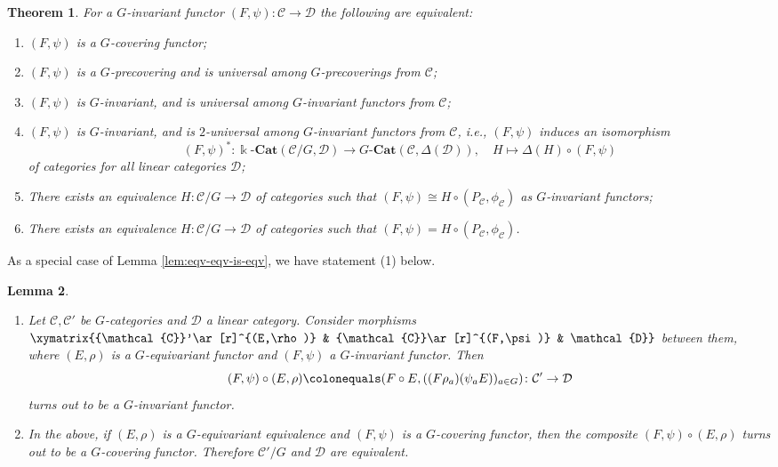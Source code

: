 \documentclass{surv-l}
\numberwithin{equation}{chapter}
\numberwithin{figure}{chapter}
\theoremstyle{plain}
\newtheorem{thm}{Theorem}[section]
\newtheorem{lem}[thm]{Lemma}
\theoremstyle{definition}
\theoremstyle{remark}
\newcommand{\kCat}{\Bbbk\text{-}\mathbf{Cat}}
\newcommand{\GCat}{G\text{-}\mathbf{Cat}}
\begin{document}
\begin{thm}\label{cov-characterization}
For a $G$-invariant functor $(F,\psi)\colon{\mathcal{C}}\to {\mathcal{D}}$
the following are equivalent:
\begin{enumerate}
\item $(F,\psi)$ is a $G$-covering functor;
\item $(F,\psi)$ is a $G$-precovering and is universal among
$G$-precoverings from ${\mathcal{C}}$;
\item $(F,\psi)$ is $G$-invariant, and is universal among
$G$-invariant functors from ${\mathcal{C}}$;
\item[(3$'$)] $(F,\psi)$ is $G$-invariant, and is $2$-universal among
$G$-invariant functors from ${\mathcal{C}}$, i.e.,
$(F,\psi)$ induces an isomorphism
\begin{equation*}
(F,\psi)^*\colon \kCat({\mathcal{C}}/G, {\mathcal{D}}) \to \GCat({\mathcal{C}}, \Delta({\mathcal{D}})),
\quad H \mapsto \Delta(H) \circ (F, \psi)
\end{equation*}
of categories for all linear categories ${\mathcal{D}}$;
\item  There exists an equivalence
$H\colon{\mathcal{C}}/G\to\mathcal{D}$ of categories such that
$(F,\psi)\cong H \circ (P_{\mathcal{C}},\phi_{\mathcal{C}})$ as $G$-invariant functors;

\item There exists an equivalence $H\colon{\mathcal{C}}/G\to\mathcal{D}$
of categories such that
$(F,\psi)=H\circ (P_{\mathcal{C}},\phi_{\mathcal{C}})$.
\end{enumerate}
\end{thm}

As a special case of Lemma \ref{lem:eqv-eqv-is-eqv}, we have statement (1) below.
\begin{lem}\leavevmode
\label{lem:equi-and-inv-is-inv}
\begin{enumerate}
\item Let ${\mathcal{C}},{\mathcal{C}}'$ be $G$-categories and ${\mathcal{D}}$ a linear category.
Consider morphisms
$\xymatrix{{\mathcal{C}}'\ar[r]^{(E,\rho)} & {\mathcal{C}}\ar[r]^{(F,\psi)} & \mathcal{D}}$ between them,
where $(E,\rho)$ is a $G$-equivariant functor and $(F,\psi)$
a $G$-invariant functor.
Then
\[
(F,\psi)\circ (E,\rho)\colonequals (F\circ E,((F\rho_{a})(\psi_{a}E))_{a\in G})\colon{\mathcal{C}}'\to\mathcal{D}
\]
turns out to be a $G$-invariant functor.
\item In the above, if $(E,\rho)$ is a $G$-equivariant equivalence and
$(F,\psi)$ is a $G$-covering functor, then
the composite $(F,\psi)\circ (E,\rho)$ turns out to be
a $G$-covering functor.  Therefore ${\mathcal{C}}'/G$ and
$\mathcal{D}$ are equivalent.
\end{enumerate}
\end{lem}
\end{document}
